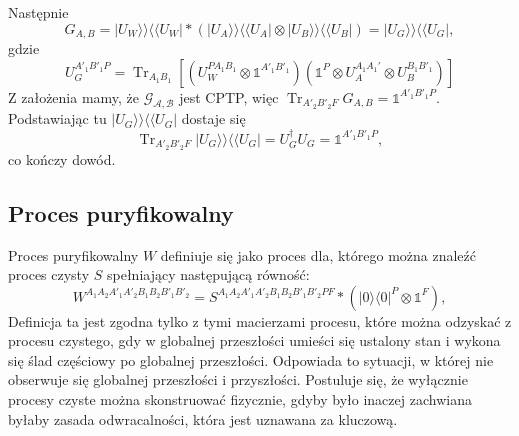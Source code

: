 \documentclass[10pt]{article} %
\DeclareMathOperator{\Trs}{Tr}
\newcommand{\Ket}[1]{|#1\rangle}
\newcommand{\Bra}[1]{\langle#1|}
\newcommand{\BBra}[1]{\langle\langle#1|}
\newcommand{\KKet}[1]{|#1\rangle\rangle}
\newcommand{\I}{\mathbb{1}}
\begin{document}
Następnie
\begin{equation}
G_{A,B} = \KKet{U_W}\BBra{U_W} * \left( \KKet{U_A}\BBra{U_A} \otimes \KKet{U_B}\BBra{U_B} \right) = \KKet{U_G}\BBra{U_G},
\end{equation} gdzie 
\begin{equation}
U_G^{A'_1B'_1P} = \Trs_{A_1B_1} \left[ \left( U_W^{PA_1B_1} \otimes \I^{A'_1B'_1}\right) \left( \I^P \otimes U_A^{A_1A_1'} \otimes U_B^{B_1B'_1}\right)\right]
\end{equation}
Z założenia mamy, że $\mathcal{G_{A,B}}$ jest CPTP, więc $\Trs_{A'_2B'_2F} G_{A,B} = \I^{A'_1B'_1P}$. Podstawiając tu $\KKet{U_G}\BBra{U_G}$ dostaje się
\begin{equation}
\Trs_{A'_2B'_2F} \KKet{U_G}\BBra{U_G} = U^\dag_G U_G = \I^{A'_1B'_1P},
\end{equation}
co kończy dowód.
\subsection{Proces puryfikowalny}
Proces puryfikowalny $W$ definiuje się jako proces dla, którego można znaleźć proces czysty $S$ spełniający następującą równość:
\begin{equation}
\label{eq:purif}
W^{A_1A_2A'_1A'_2B_1B_2B'_1B'_2} = S^{A_1A_2A'_1A'_2B_1B_2B'_1B'_2PF} * \left( \Ket{0}\Bra{0}^P \otimes \I^F \right),
\end{equation}
Definicja ta jest zgodna tylko z tymi macierzami procesu, które można odzyskać z procesu czystego, gdy w globalnej przeszłości umieści się ustalony stan i wykona się ślad częściowy po globalnej przeszłości. Odpowiada to sytuacji, w której nie obserwuje się globalnej przeszłości i przyszłości.
Postuluje się, że wyłącznie procesy czyste można skonstruować fizycznie, gdyby było inaczej zachwiana byłaby zasada odwracalności, która jest uznawana za kluczową.
\end{document}
